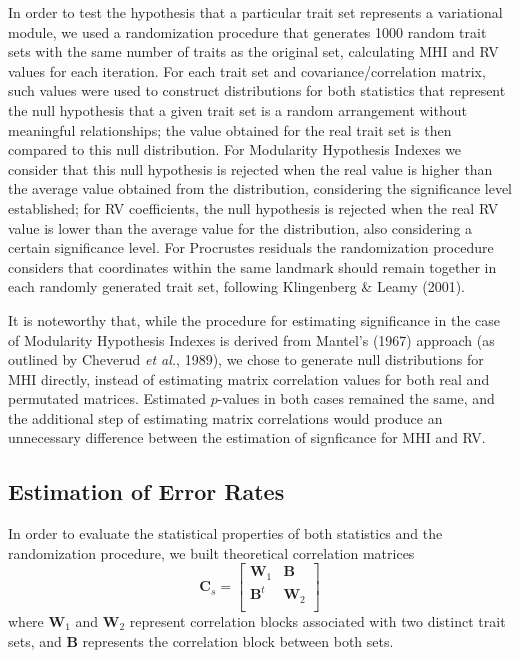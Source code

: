 \documentclass[12pt,twoside]{report}
\begin{document}
In order to test the hypothesis that a particular trait set represents a
variational module, we used a randomization procedure that generates
1000 random trait sets with the same number of traits as the original
set, calculating MHI and RV values for each iteration. For each trait
set and covariance/correlation matrix, such values were used to
construct distributions for both statistics that represent the null
hypothesis that a given trait set is a random arrangement without
meaningful relationships; the value obtained for the real trait set is
then compared to this null distribution. For Modularity Hypothesis
Indexes we consider that this null hypothesis is rejected when the real
value is higher than the average value obtained from the distribution,
considering the significance level established; for RV coefficients, the
null hypothesis is rejected when the real RV value is lower than the
average value for the distribution, also considering a certain
significance level. For Procrustes residuals the randomization procedure
considers that coordinates within the same landmark should remain
together in each randomly generated trait set, following Klingenberg \&
Leamy (2001).

It is noteworthy that, while the procedure for estimating significance
in the case of Modularity Hypothesis Indexes is derived from Mantel's
(1967) approach (as outlined by Cheverud \emph{et al.}, 1989), we chose
to generate null distributions for MHI directly, instead of estimating
matrix correlation values for both real and permutated matrices.
Estimated $p$-values in both cases remained the same, and the additional
step of estimating matrix correlations would produce an unnecessary
difference between the estimation of signficance for MHI and RV.

\subsection{Estimation of Error Rates}\label{estimation-of-error-rates}

In order to evaluate the statistical properties of both statistics and
the randomization procedure, we built theoretical correlation matrices
\[
\mathbf{C}_{s} =
\begin{bmatrix}
\mathbf{W}_1 & \mathbf{B} \\
\mathbf{B}^t & \mathbf{W}_2 \\
\end{bmatrix}
\] where $\mathbf{W}_1$ and $\mathbf{W}_2$ represent correlation blocks
associated with two distinct trait sets, and $\mathbf{B}$ represents the
correlation block between both sets.
\end{document}

